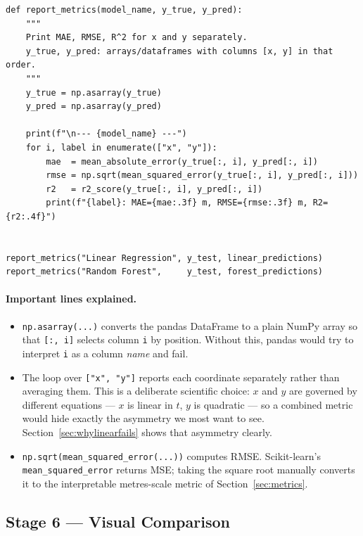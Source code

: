 \documentclass[11pt,a4paper]{article}
\begin{document}
\begin{lstlisting}[caption={Stage 5 --- computing and reporting the metrics.}]
def report_metrics(model_name, y_true, y_pred):
    """
    Print MAE, RMSE, R^2 for x and y separately.
    y_true, y_pred: arrays/dataframes with columns [x, y] in that order.
    """
    y_true = np.asarray(y_true)
    y_pred = np.asarray(y_pred)

    print(f"\n--- {model_name} ---")
    for i, label in enumerate(["x", "y"]):
        mae  = mean_absolute_error(y_true[:, i], y_pred[:, i])
        rmse = np.sqrt(mean_squared_error(y_true[:, i], y_pred[:, i]))
        r2   = r2_score(y_true[:, i], y_pred[:, i])
        print(f"{label}: MAE={mae:.3f} m, RMSE={rmse:.3f} m, R2={r2:.4f}")


report_metrics("Linear Regression", y_test, linear_predictions)
report_metrics("Random Forest",     y_test, forest_predictions)
\end{lstlisting}

\paragraph{Important lines explained.}
\begin{itemize}[leftmargin=2em,itemsep=0.2em]
  \item \texttt{np.asarray(...)} converts the pandas DataFrame to a plain NumPy array so that
        \texttt{[:, i]} selects column \texttt{i} by position. Without this, pandas would try to
        interpret \texttt{i} as a column \emph{name} and fail.
  \item The loop over \texttt{["x", "y"]} reports each coordinate separately rather than averaging
        them. This is a deliberate scientific choice: $x$ and $y$ are governed by different
        equations --- $x$ is linear in $t$, $y$ is quadratic --- so a combined metric would hide
        exactly the asymmetry we most want to see.
        Section~\ref{sec:whylinearfails} shows that asymmetry clearly.
  \item \texttt{np.sqrt(mean\_squared\_error(...))} computes RMSE. Scikit-learn's
        \texttt{mean\_squared\_error} returns MSE; taking the square root manually converts it to
        the interpretable metres-scale metric of Section~\ref{sec:metrics}.
\end{itemize}

\subsection*{Stage 6 --- Visual Comparison}
\end{document}

